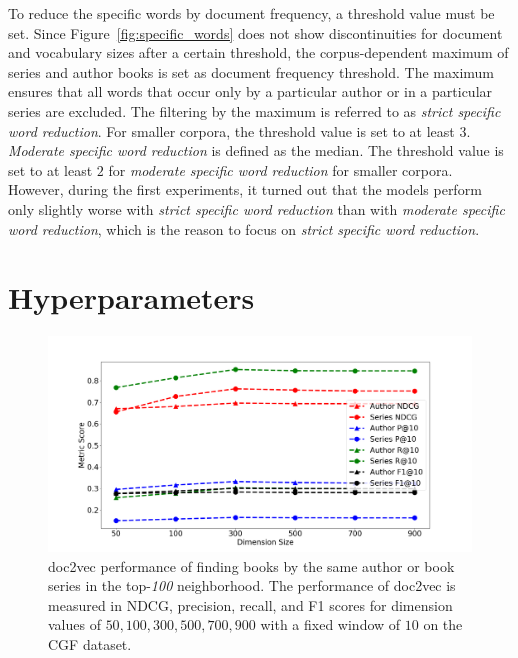 \documentclass[11pt]{article}
\begin{document}
To reduce the specific words by document frequency, a threshold value must be set.
Since Figure~\ref{fig:specific_words} does not show discontinuities for document and vocabulary sizes after a certain threshold, the corpus-dependent maximum of series and author books is set as document frequency threshold.
The maximum ensures that all words that occur only by a particular author or in a particular series are excluded.
The filtering by the maximum is referred to as \textit{strict specific word reduction}.
For smaller corpora, the threshold value is set to at least $3$.
\textit{Moderate specific word reduction} is defined as the median. 
The threshold value is set to at least $2$ for \textit{moderate specific word reduction} for smaller corpora.
However, during the first experiments, it turned out that the models perform only slightly worse with \textit{strict specific word reduction} than with \textit{moderate specific word reduction}, which is the reason to focus on \textit{strict specific word reduction}.

\section{Hyperparameters}
\begin{figure}
	\centering
	\includegraphics[width=\linewidth]{figures/dimension_performance}
	\caption{doc2vec performance of finding books by the same author or book series in the top-\textit{100} neighborhood.
		The performance of doc2vec is measured in NDCG, precision, recall, and F1 scores for dimension values of  $50, 100, 300, 500, 700, 900$ with a fixed window of $10$ on the CGF dataset.}
	\label{fig:dimension_performance}
\end{figure}
\end{document}
